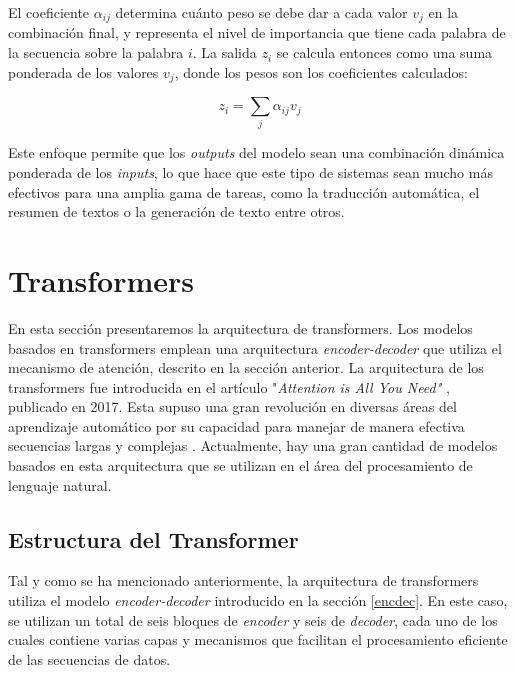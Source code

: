 \documentclass[11pt,spanish,listoffigures,listoftables]{tfgetsinf}
\begin{document}
El coeficiente $\alpha_{ij}$ determina cuánto peso se debe dar a cada valor $v_j$ en la combinación final, y representa el nivel de importancia que tiene cada palabra de la secuencia sobre la palabra $i$. La salida $z_i$ se calcula entonces como una suma ponderada de los valores $v_j$, donde los pesos son los coeficientes calculados:

\begin{equation}
z_i = \sum_j\alpha_{ij}v_j
\end{equation}

Este enfoque permite que los \textit{outputs} del modelo sean una combinación dinámica ponderada de los \textit{inputs}, lo que hace que este tipo de sistemas sean mucho más efectivos para una amplia gama de tareas, como la traducción automática, el resumen de textos o la generación de texto entre otros. \cite{murphy2022probabilistic, jurafsky2023speech}

\section{Transformers} \label{transformers}

En esta sección presentaremos la arquitectura de transformers. Los modelos basados en transformers emplean una arquitectura \textit{encoder-decoder} que utiliza el mecanismo de atención, descrito en la sección anterior. La arquitectura de los transformers fue introducida en el artículo "\textit{Attention is All You Need"} \cite{vaswani2023attentionneed}, publicado en 2017. Esta supuso una gran revolución en diversas áreas del aprendizaje automático por su capacidad para manejar de manera efectiva secuencias largas y complejas \cite{dai2019transformerxlattentivelanguagemodels}. Actualmente, hay una gran cantidad de modelos basados en esta arquitectura que se utilizan en el área del procesamiento de lenguaje natural.

\subsection{Estructura del Transformer}

Tal y como se ha mencionado anteriormente, la arquitectura de transformers utiliza el modelo \textit{encoder-decoder} introducido en la sección \ref{encdec}. En este caso, se utilizan un total de seis bloques de \textit{encoder} y seis de \textit{decoder}, cada uno de los cuales contiene varias capas y mecanismos que facilitan el procesamiento eficiente de las secuencias de datos.
\end{document}

